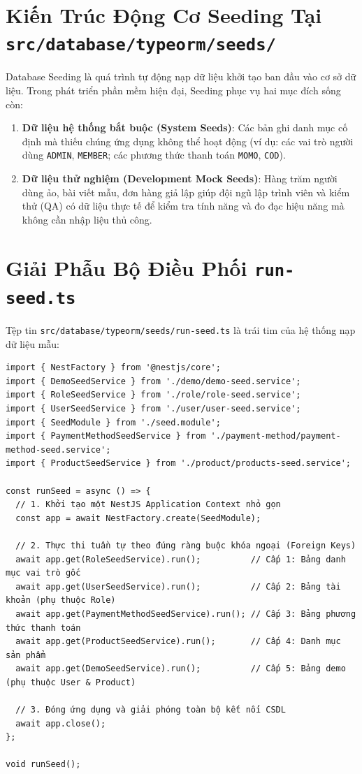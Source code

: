 \documentclass[12pt,a4paper,oneside]{book}
\begin{document}
\section{Kiến Trúc Động Cơ Seeding Tại \texttt{src/database/typeorm/seeds/}}
Database Seeding là quá trình tự động nạp dữ liệu khởi tạo ban đầu vào cơ sở dữ liệu. Trong phát triển phần mềm hiện đại, Seeding phục vụ hai mục đích sống còn:
\begin{enumerate}
  \item \textbf{Dữ liệu hệ thống bắt buộc (System Seeds)}: Các bản ghi danh mục cố định mà thiếu chúng ứng dụng không thể hoạt động (ví dụ: các vai trò người dùng \texttt{ADMIN}, \texttt{MEMBER}; các phương thức thanh toán \texttt{MOMO}, \texttt{COD}).
  \item \textbf{Dữ liệu thử nghiệm (Development Mock Seeds)}: Hàng trăm người dùng ảo, bài viết mẫu, đơn hàng giả lập giúp đội ngũ lập trình viên và kiểm thử (QA) có dữ liệu thực tế để kiểm tra tính năng và đo đạc hiệu năng mà không cần nhập liệu thủ công.
\end{enumerate}

\section{Giải Phẫu Bộ Điều Phối \texttt{run-seed.ts}}
Tệp tin \texttt{src/database/typeorm/seeds/run-seed.ts} là trái tim của hệ thống nạp dữ liệu mẫu:

\begin{codebox}
\begin{Verbatim}[fontsize=\small]
import { NestFactory } from '@nestjs/core';
import { DemoSeedService } from './demo/demo-seed.service';
import { RoleSeedService } from './role/role-seed.service';
import { UserSeedService } from './user/user-seed.service';
import { SeedModule } from './seed.module';
import { PaymentMethodSeedService } from './payment-method/payment-method-seed.service';
import { ProductSeedService } from './product/products-seed.service';

const runSeed = async () => {
  // 1. Khởi tạo một NestJS Application Context nhỏ gọn
  const app = await NestFactory.create(SeedModule);

  // 2. Thực thi tuần tự theo đúng ràng buộc khóa ngoại (Foreign Keys)
  await app.get(RoleSeedService).run();          // Cấp 1: Bảng danh mục vai trò gốc
  await app.get(UserSeedService).run();          // Cấp 2: Bảng tài khoản (phụ thuộc Role)
  await app.get(PaymentMethodSeedService).run(); // Cấp 3: Bảng phương thức thanh toán
  await app.get(ProductSeedService).run();       // Cấp 4: Danh mục sản phẩm
  await app.get(DemoSeedService).run();          // Cấp 5: Bảng demo (phụ thuộc User & Product)

  // 3. Đóng ứng dụng và giải phóng toàn bộ kết nối CSDL
  await app.close();
};

void runSeed();
\end{Verbatim}
\end{codebox}
\end{document}
